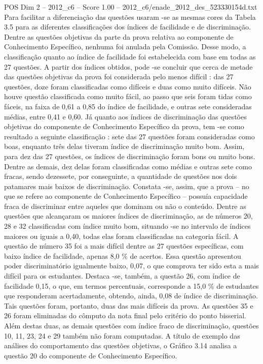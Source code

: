 \begin{textsample}{POS Dim 2 – 2012\_c6 – Score 1.00 – 2012\_c6/enade\_2012\_des\_523330154d.txt}
Para facilitar a diferenciação das questões usaram -se as mesmas cores da Tabela 3.5 para as diferentes classificações dos índices de facilidade e de discriminação.
Dentre as questões objetivas da parte da prova relativa ao componente de Conhecimento Específico, nenhuma foi anulada pela Comissão.
Desse modo, a classificação quanto ao índice de facilidade foi estabelecida com base em todas as 27 questões.
A partir dos índices obtidos, pode -se concluir que cerca de metade das questões objetivas da prova foi considerada pelo menos difícil : das 27 questões, doze foram classificadas como difíceis e duas como muito difíceis.
Não houve questão classificada como muito fácil, ao passo que seis foram tidas como fáceis, na faixa de 0,61 a 0,85 do índice de facilidade, e outras sete consideradas médias, entre 0,41 e 0,60.
Já quanto aos índices de discriminação das questões objetivas do componente de Conhecimento Específico da prova, tem -se como resultado a seguinte classificação : sete das 27 questões foram consideradas como boas, enquanto três delas tiveram índice de discriminação muito bom.
Assim, para dez das 27 questões, os índices de discriminação foram bons ou muito bons.
Dentre as demais, dez delas foram classificadas como médias e outras sete como fracas, sendo dezessete, por conseguinte, a quantidade de questões nos dois patamares mais baixos de discriminação.
Constata -se, assim, que a prova – no que se refere ao componente de Conhecimento Específico – possuía capacidade fraca de discriminar entre aqueles que dominam ou não o conteúdo.
Dentre as questões que alcançaram os maiores índices de discriminação, as de números 20, 28 e 32 classificadas com índice muito bom, situando -se no intervalo de índices maiores ou iguais a 0,40, todas elas foram classificadas na categoria fácil.
A questão de número 35 foi a mais difícil dentre as 27 questões específicas, com baixo índice de facilidade, apenas 8,0 \% de acertos.
Essa questão apresentou poder discriminatório igualmente baixo, 0,07, o que comprova ter sido esta a mais difícil para os estudantes.
Destaca -se, também, a questão 26, com índice de facilidade 0,15, o que, em termos percentuais, corresponde a 15,0 \% de estudantes que responderam acertadamente, obtendo, ainda, 0,08 de índice de discriminação.
Tais questões foram, portanto, duas das mais difíceis da prova.
As questões 35 e 26 foram eliminadas do cômputo da nota final pelo critério do ponto bisserial.
Além destas duas, as demais questões com índice fraco de discriminação, questões 10, 11, 23, 24 e 29 também não foram computadas.
A título de exemplo das análises do comportamento das questões objetivas, o Gráfico 3.14 analisa a questão 20 do componente de Conhecimento Específico.

\end{textsample}
